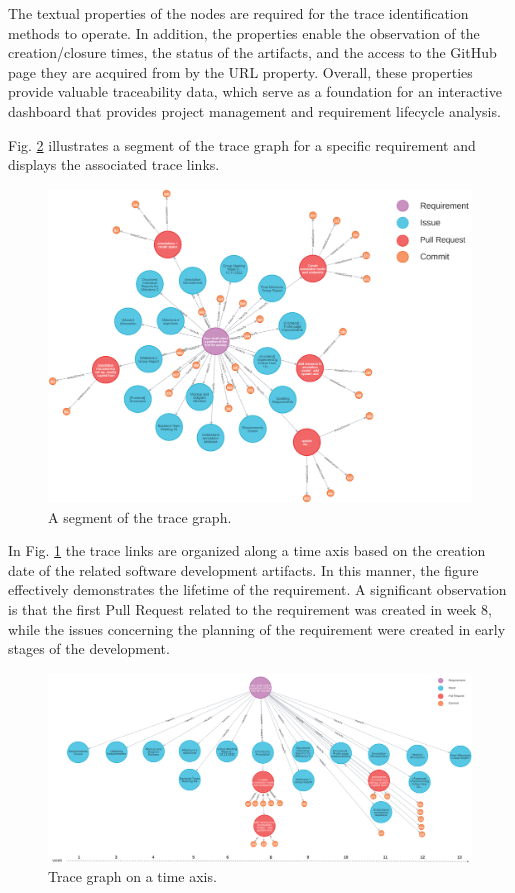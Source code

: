 The textual properties of the nodes are required for the trace identification methods to operate. In addition, the properties enable the observation of the creation/closure times, the status of the artifacts, and the access to the GitHub page they are acquired from by the URL property. Overall, these properties provide valuable traceability data, which serve as a foundation for an interactive dashboard that provides project management and requirement lifecycle analysis.

Fig. \ref{fig:tracegraph} illustrates a segment of the trace graph for a specific requirement and displays the associated trace links.

\begin{figure}[htb]
    \centering
    \includegraphics[width=0.75\linewidth]{figs/rawTraceGraph.png}
    \caption{A segment of the trace graph.}
    \label{fig:rawtracegraph}
\end{figure}


In Fig. \ref{fig:rawtracegraph} the trace links are organized along a time axis based on the creation date of the related software development artifacts. In this manner, the figure effectively demonstrates the lifetime of the requirement. A significant observation is that the first Pull Request related to the requirement was created in week 8, while the issues concerning the planning of the requirement were created in early stages of the development.


\begin{figure}[htb]
    \centering
    \includegraphics[width=0.85\linewidth]{figs/traceGraph.png}
    \caption{Trace graph on a time axis.}
    \label{fig:tracegraph}
\end{figure}

